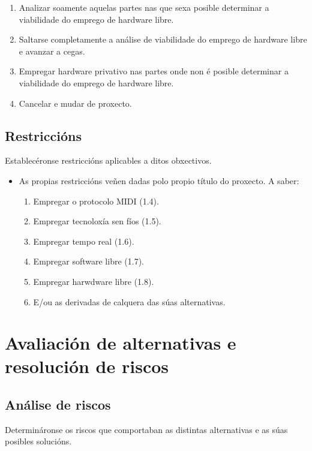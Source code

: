 \begin{enumerate}
\begin{enumerate}
         \item Analizar soamente aquelas partes nas que sexa posible determinar
               a viabilidade do emprego de hardware libre.
         \item Saltarse completamente a análise de viabilidade do emprego de
               hardware libre e avanzar a cegas.
         \item Empregar hardware privativo nas partes onde non é posible
               determinar a viabilidade do emprego de hardware libre.
         \item Cancelar e mudar de proxecto.
        \end{enumerate}
 \end{enumerate}

 \subsection{Restriccións}

 Establecéronse restriccións aplicables a ditos obxectivos.

 \begin{itemize}
  \item As propias restriccións veñen dadas polo propio título do proxecto. A
        saber:
        \begin{enumerate}
         \item Empregar o protocolo MIDI (1.4).
         \item Empregar tecnoloxía sen fíos (1.5).
         \item Empregar tempo real (1.6).
         \item Empregar software libre (1.7).
         \item Empregar harwdware libre (1.8).
         \item E/ou as derivadas de calquera das súas alternativas.
        \end{enumerate}
 \end{itemize}

\section{Avaliación de alternativas e resolución de riscos}

 \subsection{Análise de riscos}

 Determináronse os riscos que comportaban as distintas alternativas e as súas
 posibles solucións.

